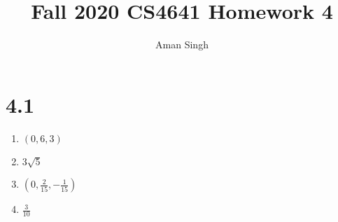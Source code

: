 \documentclass{article}
\title{Fall 2020 CS4641 Homework 4}
\author{Aman Singh}
\begin{document}
\maketitle

\section{4.1}
\begin{enumerate}
    \item $(0,6,3)$
    \item $3\sqrt5$
    \item $(0,\frac{2}{15},-\frac{1}{15})$
    \item $\frac{3}{10}$
\end{enumerate}
\end{document}
